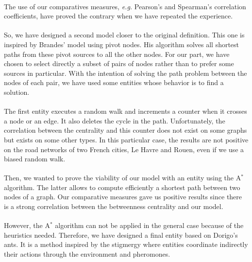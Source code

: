 \documentclass[a4paper, 10pt]{report}
\begin{document}
\paragraph{}The use of our comparatives measures, \textit{e.g.} Pearson's and Spearman's correlation coefficients, have proved the contrary when we have repeated the experience.

\paragraph{}So, we have designed a second model closer to the original definition. This one is inspired by Brandes' model using pivot nodes. His algorithm solves all shortest paths from these pivot sources to all the other nodes. For our part, we have chosen to select directly a subset of pairs of nodes rather than to prefer some sources in particular. With the intention of solving the path problem between the nodes of each pair, we have used some entities whose behavior is to find a solution.

\paragraph{}The first entity executes a random walk and increments a counter when it crosses a node or an edge. It also deletes the cycle in the path. Unfortunately, the correlation between the centrality and this counter does not exist on some graphs but exists on some other types. In this particular case, the results are not positive on the road networks of two French cities, Le Havre and Rouen, even if we use a biased random walk.

\paragraph{}Then, we wanted to prove the viability of our model with an entity using the A$^*$ algorithm. The latter allows to compute efficiently a shortest path between two nodes of a graph. Our comparative measures gave us positive results since there is a strong correlation between the betweenness centrality and our model.

\paragraph{}However, the A$^*$ algorithm can not be applied in the general case because of the heuristics needed. Therefore, we have designed a final entity based on Dorigo's ants. It is a method inspired by the stigmergy where entities coordinate indirectly their actions through the environment and pheromones.
\end{document}
